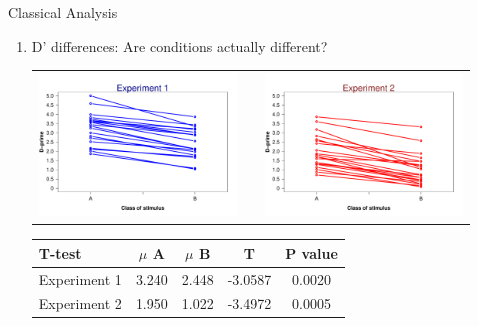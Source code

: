 \documentclass[final]{beamer}
\newlength{\sepwid}
\newlength{\onecolwid}
\newlength{\twocolwid}
\begin{document}
\begin{frame}[t]
\begin{columns}[t]
\begin{column}{\twocolwid}
\end{column} %

\begin{column}{\sepwid}\end{column} %

\setlength{\onecolwid}{0.252\paperwidth} %
\begin{column}{\onecolwid} %


\begin{alertblock}{Classical Analysis}

\begin{enumerate}
\item D' differences: Are conditions actually different?
\begin{center}
\begin{tabular}{ccc}
\includegraphics[width=0.45\linewidth]{Figures/An_Diff_D_1.pdf} & \hfill & \includegraphics[width=0.45\linewidth]{Figures/An_Diff_D_2.pdf}
\end{tabular}
\end{center}
\begin{table}
\vspace{2ex}
\begin{tabular}{l | c c c c}
\toprule
\textbf{T-test} & \textbf{$\mu$ A} & \textbf{$\mu$ B} & \textbf{T}  & \textbf{P value}\\
\midrule
Experiment 1 & 3.240 & 2.448 & -3.0587 & 0.0020 \\
Experiment 2 & 1.950 & 1.022 & -3.4972 & 0.0005 \\
\bottomrule
\end{tabular}
\end{table}


\end{enumerate}
\end{alertblock}
\end{column}
\end{columns}
\end{frame}
\end{document}
